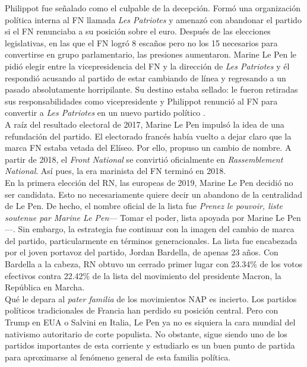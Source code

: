 Philippot fue señalado como el culpable de la decepción. Formó una organización política interna al FN llamada \textit{Les Patriotes} y amenazó con abandonar el partido si el FN renunciaba a su posición sobre el euro. Después de las elecciones legislativas, en las que el FN logró 8 escaños pero no los 15 necesarios para convertirse en grupo parlamentario, las presiones aumentaron. Marine Le Pen le pidió elegir entre la vicepresidencia del FN y la dirección de \textit{Les Patriotes} y él respondió acusando al partido de estar cambiando de línea y regresando a un pasado absolutamente horripilante. Su destino estaba sellado: le fueron retiradas sus responsabilidades como vicepresidente y Philippot renunció al FN para convertir a \textit{Les Patriotes} en un nuevo partido político \parencites{Galtier17}{Zafimehy17}.\\

A raíz del resultado electoral de 2017, Marine Le Pen impulsó la idea de una refundación del partido. El electorado francés había vuelto a dejar claro que la marca FN estaba vetada del Elíseo. Por ello, propuso un cambio de nombre. A partir de 2018, el \textit{Front National} se convirtió oficialmente en \textit{Rassemblement National}. Así pues, la era marinista del FN terminó en 2018.\\ 

En la primera elección del RN, las europeas de 2019, Marine Le Pen decidió no ser candidata. Esto no necesariamente quiere decir un abandono de la centralidad de Le Pen. De hecho, el nombre oficial de la lista fue \textit{Prenez le pouvoir, liste soutenue par Marine Le Pen}--- Tomar el poder, lista apoyada por Marine Le Pen---. Sin embargo, la estrategia fue continuar con la imagen del cambio de marca del partido, particularmente en términos generacionales. La lista fue encabezada por el joven portavoz del partido, Jordan Bardella, de apenas 23 años. Con Bardella a la cabeza, RN obtuvo un cerrado primer lugar con 23.34\% de los votos efectivos contra 22.42\% de la lista del movimiento del presidente Macron, la República en Marcha.\\ 

Qué le depara al \textit{pater familia} de los movimientos NAP es incierto. Los partidos políticos tradicionales de Francia han perdido su posición central. Pero con Trump en EUA o Salvini en Italia, Le Pen ya no es siquiera la cara mundial del nativismo autoritario de corte populista. No obstante, sigue siendo uno de los partidos importantes de esta corriente y estudiarlo es un buen punto de partida para aproximarse al fenómeno general de esta familia política. 


